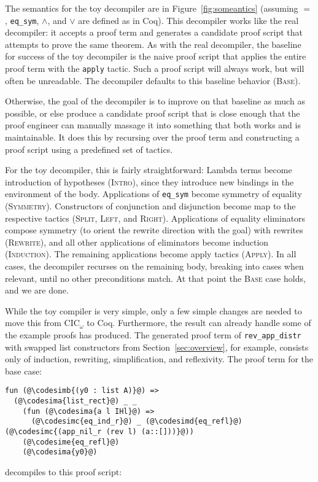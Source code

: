 The semantics for the toy decompiler are in Figure~\ref{fig:someantics} (assuming $=$, \lstinline{eq_sym}, $\wedge$, and $\vee$ are defined as in Coq).
This decompiler works like the real decompiler: it accepts a proof term and generates a candidate proof script that attempts to prove the same theorem.
As with the real decompiler, the baseline for success of the toy decompiler is the naive proof script
that applies the entire proof term with the \lstinline{apply} tactic.
Such a proof script will always work, but will often be unreadable.
The decompiler defaults to this baseline behavior (\textsc{Base}).

Otherwise, the goal of the decompiler is to improve on that baseline as much as possible,
or else produce a candidate proof script that is close enough that the proof engineer can manually massage it into something that
both works and is maintainable.
It does this by recursing over the proof term and constructing a proof script using a predefined set of tactics.

For the toy decompiler, this is fairly straightforward: Lambda terms become introduction of hypotheses (\textsc{Intro}), since they introduce new bindings
in the environment of the body. Applications of \lstinline{eq_sym} become symmetry of equality (\textsc{Symmetry}).
Constructors of conjunction and disjunction become map to the respective tactics (\textsc{Split}, \textsc{Left}, and \textsc{Right}).
Applications of equality eliminators compose symmetry (to orient the rewrite direction with the goal) with rewrites (\textsc{Rewrite}),
and all other applications of eliminators become induction (\textsc{Induction}).
The remaining applications become apply tactics (\textsc{Apply}).
In all cases, the decompiler recurses on the remaining body, breaking into cases when relevant, until no other preconditions match.
At that point the \textsc{Base} case holds, and we are done.

While the toy compiler is very simple, only a few simple changes are needed
to move this from CIC$_{\omega}$ to Coq.
Furthermore, the result can already handle some of the example proofs \toolname has produced.
The generated proof term of \lstinline{rev_app_distr} with swapped list constructors from Section~\ref{sec:overview},
for example, consists only of induction, rewriting, simplification, and reflexivity.
The proof term for the base case:

\begin{lstlisting}
fun (@\codesimb{(y0 : list A)}@) =>
  (@\codesima{list_rect}@) _ _
    (fun (@\codesima{a l IHl}@) =>
      (@\codesimc{eq_ind_r}@) _ (@\codesimd{eq_refl}@) (@\codesimc{(app_nil_r (rev l) (a::[]))}@))
    (@\codesime{eq_refl}@)
    (@\codesima{y0}@)
\end{lstlisting}
decompiles to this proof script:

